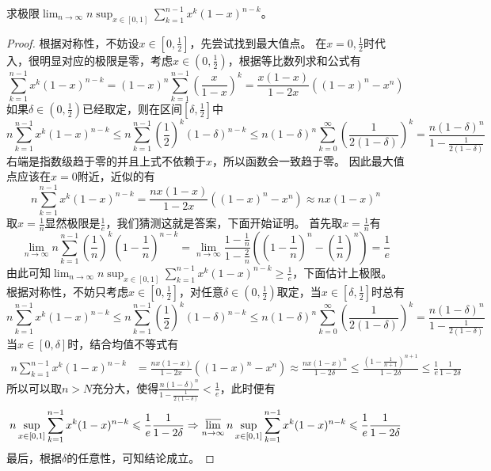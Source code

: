 \documentclass[../../main.tex]{subfiles}%
\begin{document}
\begin{example}
求极限\(\lim_{n\rightarrow\infty}n\sup_{x\in[0,1]}\sum_{k = 1}^{n - 1}x^{k}(1 - x)^{n - k}\)。
\end{example}
\begin{proof}

根据对称性，不妨设\(x\in\left[0,\frac{1}{2}\right]\)，先尝试找到最大值点。
在\(x = 0,\frac{1}{2}\)时代入，很明显对应的极限是零，考虑\(x\in\left(0,\frac{1}{2}\right)\)，根据等比数列求和公式有
\[
\sum_{k = 1}^{n - 1}x^{k}(1 - x)^{n - k}=(1 - x)^{n}\sum_{k = 1}^{n - 1}\left(\frac{x}{1 - x}\right)^{k}=\frac{x(1 - x)}{1 - 2x}((1 - x)^{n}-x^{n})
\]
如果\(\delta\in\left(0,\frac{1}{2}\right)\)已经取定，则在区间\(\left[\delta,\frac{1}{2}\right]\)中
\[
n\sum_{k = 1}^{n - 1}x^{k}(1 - x)^{n - k}\leqslant  n\sum_{k = 1}^{n - 1}\left(\frac{1}{2}\right)^{k}(1 - \delta)^{n - k}\leqslant  n(1 - \delta)^{n}\sum_{k = 0}^{\infty}\left(\frac{1}{2(1 - \delta)}\right)^{k}=\frac{n(1 - \delta)^{n}}{1-\frac{1}{2(1 - \delta)}}
\]
右端是指数级趋于零的并且上式不依赖于\(x\)，所以函数会一致趋于零。
因此最大值点应该在\(x = 0\)附近，近似的有
\[
n\sum_{k = 1}^{n - 1}x^{k}(1 - x)^{n - k}=\frac{nx(1 - x)}{1 - 2x}((1 - x)^{n}-x^{n})\approx nx(1 - x)^{n}
\]
取\(x = \frac{1}{n}\)显然极限是\(\frac{1}{e}\)，我们猜测这就是答案，下面开始证明。
首先取\(x = \frac{1}{n}\)有
\[
\lim_{n\rightarrow\infty}n\sum_{k = 1}^{n - 1}\left(\frac{1}{n}\right)^{k}\left(1-\frac{1}{n}\right)^{n - k}=\lim_{n\rightarrow\infty}\frac{1-\frac{1}{n}}{1-\frac{2}{n}}\left(\left(1-\frac{1}{n}\right)^{n}-\left(\frac{1}{n}\right)^{n}\right)=\frac{1}{e}
\]
由此可知\(\lim_{n\rightarrow\infty}n\sup_{x\in[0,1]}\sum_{k = 1}^{n - 1}x^{k}(1 - x)^{n - k}\geqslant \frac{1}{e}\)，下面估计上极限。
根据对称性，不妨只考虑\(x\in\left[0,\frac{1}{2}\right]\)，对任意\(\delta\in\left(0,\frac{1}{2}\right)\)取定，当\(x\in\left[\delta,\frac{1}{2}\right]\)时总有
\[
n\sum_{k = 1}^{n - 1}x^{k}(1 - x)^{n - k}\leqslant  n\sum_{k = 1}^{n - 1}\left(\frac{1}{2}\right)^{k}(1 - \delta)^{n - k}\leqslant  n(1 - \delta)^{n}\sum_{k = 0}^{\infty}\left(\frac{1}{2(1 - \delta)}\right)^{k}=\frac{n(1 - \delta)^{n}}{1-\frac{1}{2(1 - \delta)}}
\]
当\(x\in[0,\delta]\)时，结合均值不等式有
\begin{align*}
n\sum_{k = 1}^{n - 1}x^{k}(1 - x)^{n - k}&=\frac{nx(1 - x)}{1 - 2x}((1 - x)^{n}-x^{n})\approx\frac{nx(1 - x)^{n}}{1 - 2\delta}\leqslant \frac{\left(1-\frac{1}{n + 1}\right)^{n + 1}}{1 - 2\delta}\leqslant \frac{1}{e}\frac{1}{1 - 2\delta}
\end{align*}
所以可以取\(n > N\)充分大，使得\(\frac{n(1 - \delta)^{n}}{1-\frac{1}{2(1 - \delta)}}<\frac{1}{e}\)，此时便有
\[
n\sup_{x\in[0,1]}\sum_{k = 1}^{n - 1}x^{k}(1 - x)^{n - k}\leqslant \frac{1}{e}\frac{1}{1 - 2\delta}\Rightarrow\varlimsup_{n\rightarrow\infty}n\sup_{x\in[0,1]}\sum_{k = 1}^{n - 1}x^{k}(1 - x)^{n - k}\leqslant \frac{1}{e}\frac{1}{1 - 2\delta}
\]
最后，根据\(\delta\)的任意性，可知结论成立。

\end{proof}
\end{document}
